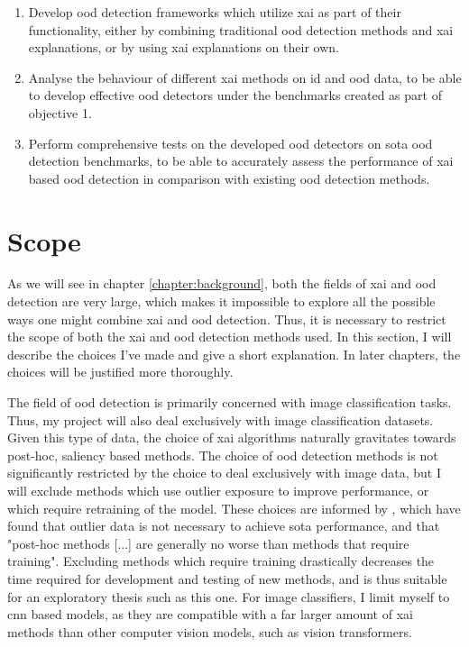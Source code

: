 \documentclass[UKenglish]{uiomasterthesis} %
\theoremstyle{definition}
\begin{document}
\begin{enumerate}
    \item Develop \ac{ood} detection frameworks which utilize \ac{xai} as part of their functionality, either by combining traditional \ac{ood} detection methods and \ac{xai} explanations, or by using \ac{xai} explanations on their own.
    \item Analyse the behaviour of different \ac{xai} methods on \ac{id} and \ac{ood} data, to be able to develop effective \ac{ood} detectors under the benchmarks created as part of objective 1.
    \item Perform comprehensive tests on the developed \ac{ood} detectors on \ac{sota} \ac{ood} detection benchmarks, to be able to accurately assess the performance of \ac{xai} based \ac{ood} detection in comparison with existing \ac{ood} detection methods.
\end{enumerate}

\section{Scope} \label{section:scope}

As we will see in chapter \ref{chapter:background}, both the fields of \ac{xai} and \ac{ood} detection are very large, which makes it impossible to explore all the possible ways one might combine \ac{xai} and \ac{ood} detection. Thus, it is necessary to restrict the scope of both the \ac{xai} and \ac{ood} detection methods used. In this section, I will describe the choices I've made and give a short explanation. In later chapters, the choices will be justified more thoroughly.

The field of \ac{ood} detection is primarily concerned with image classification tasks. Thus, my project will also deal exclusively with image classification datasets. Given this type of data, the choice of \ac{xai} algorithms naturally gravitates towards post-hoc, saliency based methods. The choice of \ac{ood} detection methods is not significantly restricted by the choice to deal exclusively with image data, but I will exclude methods which use outlier exposure to improve performance, or which require retraining of the model. These choices are informed by \cite{openood}, which have found that outlier data is not necessary to achieve \ac{sota} performance, and that "post-hoc methods [...] are generally no worse than methods that require training". Excluding methods which require training drastically decreases the time required for development and testing of new methods, and is thus suitable for an exploratory thesis such as this one. For image classifiers, I limit myself to \ac{cnn} based models, as they are compatible with a far larger amount of \ac{xai} methods than other computer vision models, such as vision transformers.
\end{document}
